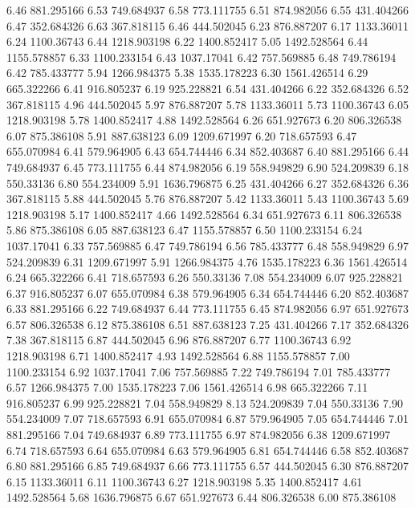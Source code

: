 6.46 	881.295166
6.53 	749.684937
6.58 	773.111755
6.51 	874.982056
6.55 	431.404266
6.47 	352.684326
6.63 	367.818115
6.46 	444.502045
6.23 	876.887207
6.17 	1133.36011
6.24 	1100.36743
6.44 	1218.903198
6.22 	1400.852417
5.05 	1492.528564
6.44 	1155.578857
6.33 	1100.233154
6.43 	1037.17041
6.42 	757.569885
6.48 	749.786194
6.42 	785.433777
5.94 	1266.984375
5.38 	1535.178223
6.30 	1561.426514
6.29 	665.322266
6.41 	916.805237
6.19 	925.228821
6.54 	431.404266
6.22 	352.684326
6.52 	367.818115
4.96 	444.502045
5.97 	876.887207
5.78 	1133.36011
5.73 	1100.36743
6.05 	1218.903198
5.78 	1400.852417
4.88 	1492.528564
6.26 	651.927673
6.20 	806.326538
6.07 	875.386108
5.91 	887.638123
6.09 	1209.671997
6.20 	718.657593
6.47 	655.070984
6.41 	579.964905
6.43 	654.744446
6.34 	852.403687
6.40 	881.295166
6.44 	749.684937
6.45 	773.111755
6.44 	874.982056
6.19 	558.949829
6.90 	524.209839
6.18 	550.33136
6.80 	554.234009
5.91 	1636.796875
6.25 	431.404266
6.27 	352.684326
6.36 	367.818115
5.88 	444.502045
5.76 	876.887207
5.42 	1133.36011
5.43 	1100.36743
5.69 	1218.903198
5.17 	1400.852417
4.66 	1492.528564
6.34 	651.927673
6.11 	806.326538
5.86 	875.386108
6.05 	887.638123
6.47 	1155.578857
6.50 	1100.233154
6.24 	1037.17041
6.33 	757.569885
6.47 	749.786194
6.56 	785.433777
6.48 	558.949829
6.97 	524.209839
6.31 	1209.671997
5.91 	1266.984375
4.76 	1535.178223
6.36 	1561.426514
6.24 	665.322266
6.41 	718.657593
6.26 	550.33136
7.08 	554.234009
6.07 	925.228821
6.37 	916.805237
6.07 	655.070984
6.38 	579.964905
6.34 	654.744446
6.20 	852.403687
6.33 	881.295166
6.22 	749.684937
6.44 	773.111755
6.45 	874.982056
6.97 	651.927673
6.57 	806.326538
6.12 	875.386108
6.51 	887.638123
7.25 	431.404266
7.17 	352.684326
7.38 	367.818115
6.87 	444.502045
6.96 	876.887207
6.77 	1100.36743
6.92 	1218.903198
6.71 	1400.852417
4.93 	1492.528564
6.88 	1155.578857
7.00 	1100.233154
6.92 	1037.17041
7.06 	757.569885
7.22 	749.786194
7.01 	785.433777
6.57 	1266.984375
7.00 	1535.178223
7.06 	1561.426514
6.98 	665.322266
7.11 	916.805237
6.99 	925.228821
7.04 	558.949829
8.13 	524.209839
7.04 	550.33136
7.90 	554.234009
7.07 	718.657593
6.91 	655.070984
6.87 	579.964905
7.05 	654.744446
7.01 	881.295166
7.04 	749.684937
6.89 	773.111755
6.97 	874.982056
6.38 	1209.671997
6.74 	718.657593
6.64 	655.070984
6.63 	579.964905
6.81 	654.744446
6.58 	852.403687
6.80 	881.295166
6.85 	749.684937
6.66 	773.111755
6.57 	444.502045
6.30 	876.887207
6.15 	1133.36011
6.11 	1100.36743
6.27 	1218.903198
5.35 	1400.852417
4.61 	1492.528564
5.68 	1636.796875
6.67 	651.927673
6.44 	806.326538
6.00 	875.386108
